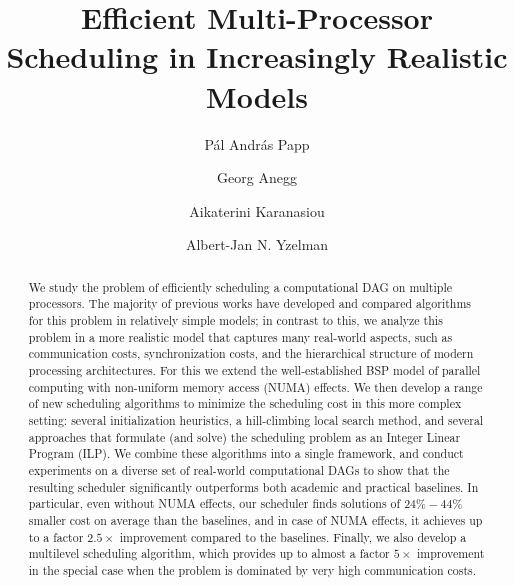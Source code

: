 \documentclass[sigconf,nonacm]{acmart}
\begin{document}
\title{Efficient Multi-Processor Scheduling in Increasingly Realistic Models}

\author{P\'al Andr\'as Papp}

\author{Georg Anegg}

\author{Aikaterini Karanasiou}

\author{Albert-Jan N. Yzelman}


\begin{abstract}
We study the problem of efficiently scheduling a computational DAG on multiple processors. The majority of previous works have developed and compared algorithms for this problem in relatively simple models; in contrast to this, we analyze this problem in a more realistic model that captures many real-world aspects, such as communication costs, synchronization costs, and the hierarchical structure of modern processing architectures. For this we extend the well-established BSP model of parallel computing with non-uniform memory access (NUMA) effects. We then develop a range of new scheduling algorithms to minimize the scheduling cost in this more complex setting: several initialization heuristics, a hill-climbing local search method, and several approaches that formulate (and solve) the scheduling problem as an Integer Linear Program (ILP). We combine these algorithms into a single framework, and conduct experiments on a diverse set of real-world computational DAGs to show that the resulting scheduler significantly outperforms both academic and practical baselines. In particular, even without NUMA effects, our scheduler finds solutions of $24\%-44\%$ smaller cost on average than the baselines, and in case of NUMA effects, it achieves up to a factor $2.5\times$ improvement compared to the baselines. Finally, we also develop a multilevel scheduling algorithm, which provides up to almost a factor $5\times$ improvement in the special case when the problem is dominated by very high communication costs.
\end{abstract}
\end{document}
